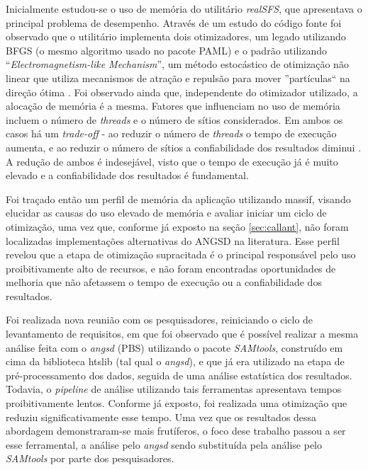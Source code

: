 \documentclass[cic,tc]{iiufrgs}
\begin{document}
Inicialmente estudou-se o uso de memória do utilitário \textit{realSFS}, que apresentava o
principal problema de desempenho. Através de um estudo do código fonte foi
observado que o utilitário implementa dois otimizadores, um legado utilizando
BFGS (o mesmo algoritmo usado no pacote PAML) e o padrão utilizando
``\textit{Electromagnetism-like Mechanism}'', um método estocástico de otimização
não linear que utiliza mecanismos de atração e repulsão para mover
''partículas`` na direção ótima \cite{5636954}. Foi observado ainda que,
independente do otimizador utilizado, a alocação de memória é a mesma. Fatores
que influenciam no uso de memória incluem o número de \textit{threads} e o número de
sítios considerados. Em ambos os casos há um \textit{trade-off} - ao reduzir o
número de \textit{threads} o tempo de execução aumenta, e ao reduzir o número de sítios
a confiabilidade dos resultados diminui \cite{popgen2016angsd}. A redução de
ambos é indesejável, visto que o tempo de execução já é muito elevado e a
confiabilidade dos resultados é fundamental.

Foi traçado então um perfil de memória da aplicação utilizando massif, visando
elucidar as causas do uso elevado de memória e avaliar iniciar um ciclo de
otimização, uma vez que, conforme já exposto na seção \ref{sec:callant}, não
foram localizadas implementações alternativas do ANGSD na literatura. Esse
perfil revelou que a etapa de otimização supracitada é o principal responsável
pelo uso proibitivamente alto de recursos, e não foram encontradas
oportunidades de melhoria que não afetassem o tempo de execução ou a
confiabilidade dos resultados.

Foi realizada nova reunião com os pesquisadores, reiniciando o ciclo de
levantamento de requisitos, em que foi observado que é possível realizar a mesma
análise feita com o \textit{angsd} (PBS) utilizando o pacote \textit{SAMtools}, construído em
cima da biblioteca htslib (tal qual o \textit{angsd}), e que já era utilizado na etapa
de pré-processamento dos dados, seguida de uma análise estatística dos
resultados. Todavia, o \textit{pipeline} de análise utilizando tais ferramentas
apresentava tempos proibitivamente lentos. Conforme já exposto, foi realizada
uma otimização que reduziu significativamente esse tempo. Uma vez que os
resultados dessa abordagem demonstraram-se mais frutíferos, o foco dese
trabalho passou a ser esse ferramental, a análise pelo \textit{angsd} sendo substituída
pela análise pelo \textit{SAMtools} por parte dos pesquisadores.

%
%
%
%
\end{document}
